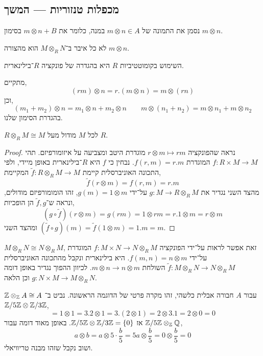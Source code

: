 \subsection{מכפלות טנזוריות --- המשך}
\begin{remark}
	נסמן את התמונה של $m \otimes n \in A$ במנה, כלומר את $m \otimes n + B$ בסימון $m \otimes n$.
\end{remark}
\begin{remark}
	לא כל איבר ב־$M \otimes_R N$ הוא מהצורה $m \otimes n$.
\end{remark}
\begin{remark}
	השימוש בקומוטטיביות $R$ היא בהגדרה של פונקציה $R$־בילינארית.
\end{remark}
\begin{remark}
	מתקיים,
	\[
		(r m) \otimes n
		= r . (m \otimes n)
		= m \otimes (r n)
	\]
	וכן,
	\[
		(m_1 + m_2) \otimes n
		= m_1 \otimes n + m_2 \otimes n
		\qquad
		m \otimes (n_1 + n_2)
		= m \otimes n_1 + m \otimes n_2
	\]
	בהגדרת הסימון שלנו.
\end{remark}
\begin{example}
	$R \otimes_R M \cong M$ לכל $M$ מודול מעל $R$.
\end{example}
\begin{proof}
	נראה שהפונקציה $r \otimes m \mapsto r m$ מוגדרת היטב ומצביעה על איזומורפיזם.
	תהי $f : R \times M \to M$ המוגדרת $f(r, m) = r . m$. נבחין כי $f$ היא $R$־בילינארית באופן מיידי, ולפי התכונה האוניברסלית קיימת $\tilde{f} : R \otimes_R M \to M$ המקיימת,
	\[
		\tilde{f}(r \otimes m)
		= f(r, m)
		= r . m
	\]
	מהצד השני נגדיר את $g : M \to R \otimes_R M$ על־ידי $g(m) = 1 \otimes m$, זהו הומומורפיזם מודולים, ונראה ש־$\tilde{f}, g$ הן הופכיות,
	\[
		(g \circ \tilde{f})(r \otimes m)
		= g(r m)
		= 1 \otimes r m
		= r . 1 \otimes m
		= r \otimes m
	\]
	ומהצד השני $(\tilde{f} \circ g)(m) = \tilde{f}(1 \otimes m) = 1 . m = m$.
\end{proof}
\begin{example}
	$M \otimes_R N \cong N \otimes_R M$, זאת אפשר לראות על־ידי הפונקציה $f : M \times N \to N \otimes_R M$ המוגדרת על־ידי $f(m, n) = n \otimes m$.
	היא בילינארית ונקבל מהתכונה האוניברסלית $\tilde{f} : M \otimes_R N \to N \otimes_R M$ השולחת $m \otimes n \to n \otimes m$.
	לכיוון ההפוך נגדיר באופן דומה $g : N \times M \to M \otimes_R N$ וכן הלאה.
\end{example}
\begin{example}
	$\mathbb{Z} \otimes_{\mathbb{Z}} A \cong A$ עבור $A$ חבורה אבלית כלשהי, זהו מקרה פרטי של הדוגמה הראשונה.
	נביט ב־$\mathbb{Z} / 5 \mathbb{Z} \otimes \mathbb{Z} / 3 \mathbb{Z}$,
	\[
		= 1 \otimes 1
		= 3 . 2 \otimes 1
		= 3 . (2 \otimes 1)
		= 2 \otimes 3 . 1
		= 2 \otimes 0
		= 0
	\]
	אז $\mathbb{Z} / 5 \mathbb{Z} \otimes \mathbb{Z} / 3 \mathbb{Z} = \{ 0 \}$.
	באופן מאוד דומה עבור $\mathbb{Z} / 5 \mathbb{Z} \otimes_{\mathbb{Z}} \mathbb{Q}$,
	\[
		a \otimes b
		= a \otimes 5 \cdot \frac{b}{5}
		= 5 a \otimes \frac{b}{5}
		= 0 \otimes \frac{b}{5}
		= 0
	\]
	ושוב נקבל שזהו מבנה טריוויאלי.
\end{example}
